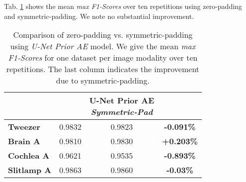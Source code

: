Tab. \ref{tab:zero_vs_sym_padd} shows the mean \textit{max F1-Scores} over ten repetitions using zero-padding and symmetric-padding. We note no substantial improvement.

\begin{table}[!htbp]
   \centering
   \caption[Zero-padding vs. symmetric-padding]{Comparison of zero-padding vs. symmetric-padding using \textit{U-Net Prior AE} model.
     We give the mean \textit{max F1-Scores} for one dataset per image modality over ten repetitions.
     The last column indicates the improvement due to symmetric-padding.}
   \small
   \begin{tabular}{l|c|c||c|}
      \toprule
       & \Gape[6pt][6pt]{\rotatebox[origin=cB]{90}{\parbox[t]{2.6cm}{U-Net Prior AE \\ \textit{\textbf{Zero-Pad}\hspace*{\fill}}}}}
       & \rotatebox[origin=cB]{90}{\parbox[t]{2.6cm}{U-Net Prior AE \\ \textit{\textbf{Symmetric-Pad}\hspace*{\fill}}}}
       & \rotatebox[origin=cB]{90}{\parbox[t]{2.6cm}{\textbf{Improvement\hspace*{\fill}}}} \\
      \midrule
      \textbf{Tweezer} & 0.9832 & 0.9823  & \textbf{-0.091\%} \\\midrule
      \textbf{Brain A} & 0.9810 & 0.9830 &  \textbf{+0.203\%} \\\midrule
      \textbf{Cochlea A} & 0.9621 & 0.9535 & \textbf{-0.893\%} \\\midrule
      \textbf{Slitlamp A} & 0.9863 & 0.9860 & \textbf{-0.03\%} \\
      \bottomrule
   \end{tabular}
   \label{tab:zero_vs_sym_padd}
\end{table}

